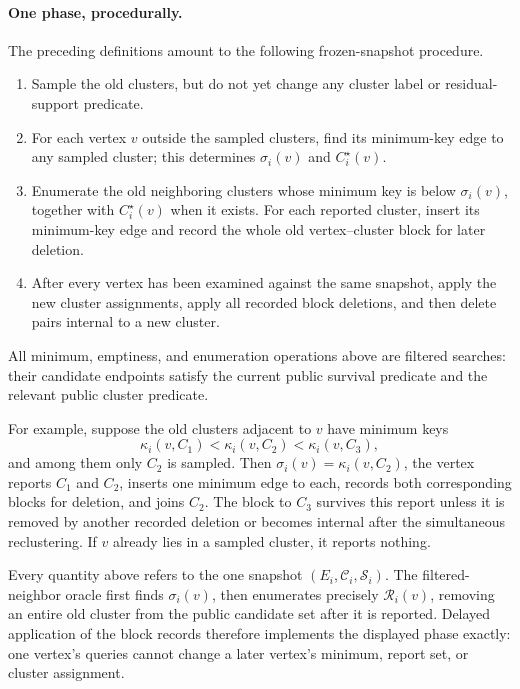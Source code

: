 \documentclass[11pt]{article}
\theoremstyle{definition}
\begin{document}
\paragraph{One phase, procedurally.}
The preceding definitions amount to the following frozen-snapshot procedure.
\begin{enumerate}[label=(\arabic*)]
\item Sample the old clusters, but do not yet change any cluster label or
      residual-support predicate.
\item For each vertex $v$ outside the sampled clusters, find its minimum-key
      edge to any sampled cluster; this determines $\sigma_i(v)$ and
      $C_i^\star(v)$.
\item Enumerate the old neighboring clusters whose minimum key is below
      $\sigma_i(v)$, together with $C_i^\star(v)$ when it exists.  For each
      reported cluster, insert its minimum-key edge and record the whole old
      vertex--cluster block for later deletion.
\item After every vertex has been examined against the same snapshot, apply
      the new cluster assignments, apply all recorded block deletions, and
      then delete pairs internal to a new cluster.
\end{enumerate}
All minimum, emptiness, and enumeration operations above are filtered searches:
their candidate endpoints satisfy the current public survival predicate and
the relevant public cluster predicate.

For example, suppose the old clusters adjacent to $v$ have minimum keys
\[
        \kappa_i(v,C_1)<\kappa_i(v,C_2)<\kappa_i(v,C_3),
\]
and among them only $C_2$ is sampled.  Then
$\sigma_i(v)=\kappa_i(v,C_2)$, the vertex reports $C_1$ and $C_2$, inserts
one minimum edge to each, records both corresponding blocks for deletion, and
joins $C_2$.  The block to $C_3$ survives this report unless it is removed by
another recorded deletion or becomes internal after the simultaneous
reclustering.  If $v$ already lies in a sampled cluster, it reports nothing.

Every quantity above refers to the one snapshot
$(E_i,\mathcal C_i,\mathcal S_i)$.  The filtered-neighbor oracle first finds
$\sigma_i(v)$, then enumerates precisely $\mathcal R_i(v)$, removing an
entire old cluster from the public candidate set after it is reported.
Delayed application of the block records therefore implements the displayed
phase exactly: one vertex's queries cannot change a later vertex's minimum,
report set, or cluster assignment.
\end{document}
